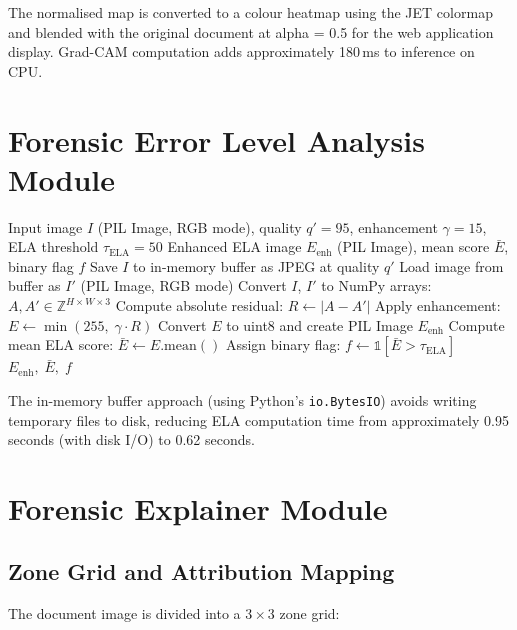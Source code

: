 \documentclass[12pt,a4paper,oneside]{report}
\begin{document}
The normalised map is converted to a colour heatmap using the JET colormap and
blended with the original document at alpha = 0.5 for the web application display.
Grad-CAM computation adds approximately 180\,ms to inference on CPU.

\section{Forensic Error Level Analysis Module}
\label{sec:ela_impl}

\begin{algorithm}[H]
\caption{TruthLens Forensic ELA Computation}
\label{alg:ela_full}
\begin{algorithmic}[1]
\Require Input image $I$ (PIL Image, RGB mode), quality $q' = 95$,
         enhancement $\gamma = 15$, ELA threshold $\tau_{\text{ELA}} = 50$
\Ensure Enhanced ELA image $E_{\text{enh}}$ (PIL Image), mean score $\bar{E}$, binary flag $f$
\State Save $I$ to in-memory buffer as JPEG at quality $q'$
\State Load image from buffer as $I'$ (PIL Image, RGB mode)
\State Convert $I$, $I'$ to NumPy arrays: $A, A' \in \mathbb{Z}^{H \times W \times 3}$
\State Compute absolute residual: $R \leftarrow |A - A'|$
\State Apply enhancement: $E \leftarrow \min(255,\; \gamma \cdot R)$
\State Convert $E$ to uint8 and create PIL Image $E_{\text{enh}}$
\State Compute mean ELA score: $\bar{E} \leftarrow E.\text{mean}()$
\State Assign binary flag: $f \leftarrow \mathbb{1}[\bar{E} > \tau_{\text{ELA}}]$
\State \Return $E_{\text{enh}},\; \bar{E},\; f$
\end{algorithmic}
\end{algorithm}

The in-memory buffer approach (using Python's \texttt{io.BytesIO}) avoids
writing temporary files to disk, reducing ELA computation time from approximately
0.95 seconds (with disk I/O) to 0.62 seconds.

\section{Forensic Explainer Module}
\label{sec:explainer_impl}

\subsection{Zone Grid and Attribution Mapping}

The document image is divided into a $3\times3$ zone grid:
\end{document}
